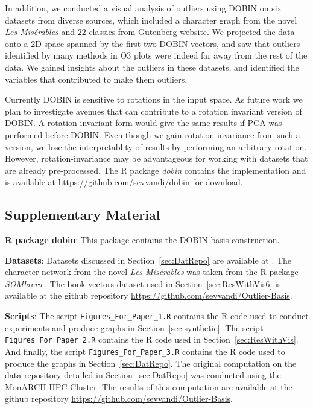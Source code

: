 \documentclass[a4paper,11pt]{article}
\begin{document}
In addition, we conducted a visual analysis of outliers using DOBIN on six datasets from diverse sources, which included a character graph from the novel \textit{Les Mis\'erables} and $22$ classics from Gutenberg website. We projected the data onto a 2D space spanned by the first two DOBIN vectors, and saw that outliers identified by many methods in O3 plots were indeed far away from the rest of the data. We gained insights about the outliers in these datasets, and identified the variables that contributed to make them outliers.


Currently DOBIN is sensitive to rotations in the input space. As future work we plan to investigate avenues that can contribute to a rotation invariant version of DOBIN. A rotation invariant form would give the same results if PCA was performed before DOBIN. Even though we gain rotation-invariance from such a version, we lose the interpretablity of results by performing an arbitrary rotation.  However, rotation-invariance may be advantageous for working with datasets that are already pre-processed.   The R package \textit{dobin} contains the implementation and is available at \url{https://github.com/sevvandi/dobin} for download.

\subsection*{Supplementary Material}

\textbf{R package dobin}: This package contains the DOBIN basis construction.

\textbf{Datasets}: Datasets discussed in Section~\ref{sec:DatRepo} are available at \cite{datasets}. The character network from the novel \textit{Les Mis\'erables} was taken from the R package \textit{SOMbrero} \citep{sombrero}. The book vectors dataset used in Section~\ref{sec:ResWithVis6} is available at the github repository \url{https://github.com/sevvandi/Outlier-Basis}.

\textbf{Scripts}: The script \texttt{Figures\_For\_Paper\_1.R} contains the R code used to conduct experiments and produce graphs in Section~\ref{sec:synthetic}. The script \texttt{Figures\_For\_Paper\_2.R} contains the R code used in Section~\ref{sec:ResWithVis}. And finally, the script \texttt{Figures\_For\_Paper\_3.R} contains the R code used to produce the graphs in Section~\ref{sec:DatRepo}. The original computation on the data repository detailed in Section~\ref{sec:DatRepo} was conducted using the MonARCH HPC Cluster. The results of this computation are available at the github repository \url{https://github.com/sevvandi/Outlier-Basis}.
\end{document}
